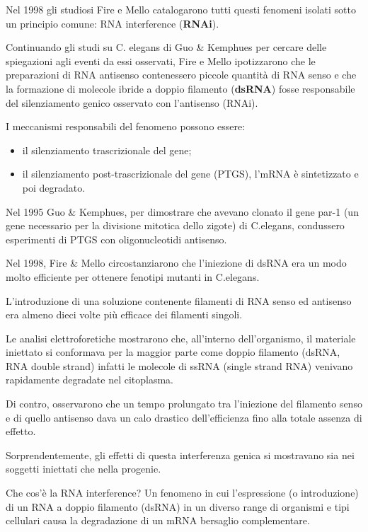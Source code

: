 \documentclass[11pt]{book}
\begin{document}
Nel 1998 gli studiosi Fire e Mello catalogarono tutti questi fenomeni
isolati sotto un principio comune: RNA interference (\textbf{RNAi}).

Continuando gli studi su C. elegans di Guo \& Kemphues per cercare delle
spiegazioni agli eventi da essi osservati, Fire e Mello ipotizzarono che
le preparazioni di RNA antisenso contenessero piccole quantità di RNA
senso e che la formazione di molecole ibride a doppio filamento
(\textbf{dsRNA}) fosse responsabile del silenziamento genico osservato
con l'antisenso (RNAi).

I meccanismi responsabili del fenomeno possono essere:

\begin{itemize}
\itemsep1pt\parskip0pt
\item
  il silenziamento trascrizionale del gene;
\item
  il silenziamento post-trascrizionale del gene (PTGS), l'mRNA è
  sintetizzato e poi degradato.
\end{itemize}

Nel 1995 Guo \& Kemphues, per dimostrare che avevano clonato il gene
par-1 (un gene necessario per la divisione mitotica dello zigote) di
C.elegans, condussero esperimenti di PTGS con oligonucleotidi antisenso.

Nel 1998, Fire \& Mello circostanziarono che l'iniezione di dsRNA era
un modo molto efficiente per ottenere fenotipi mutanti in C.elegans.

L'introduzione di una soluzione contenente filamenti di RNA senso ed
antisenso era almeno dieci volte più efficace dei filamenti singoli.

Le analisi elettroforetiche mostrarono che, all'interno dell'organismo,
il materiale iniettato si conformava per la maggior parte come doppio
filamento (dsRNA, RNA double strand) infatti le molecole di ssRNA
(single strand RNA) venivano rapidamente degradate nel citoplasma.

Di contro, osservarono che un tempo prolungato tra l'iniezione del
filamento senso e di quello antisenso dava un calo drastico
dell'efficienza fino alla totale assenza di effetto.

Sorprendentemente, gli effetti di questa interferenza genica si
mostravano sia nei soggetti iniettati che nella progenie.

Che cos'è la RNA interference? Un fenomeno in cui l'espressione (o
introduzione) di un RNA a doppio filamento (dsRNA) in un diverso range
di organismi e tipi cellulari causa la degradazione di un mRNA bersaglio
complementare.
\end{document}
